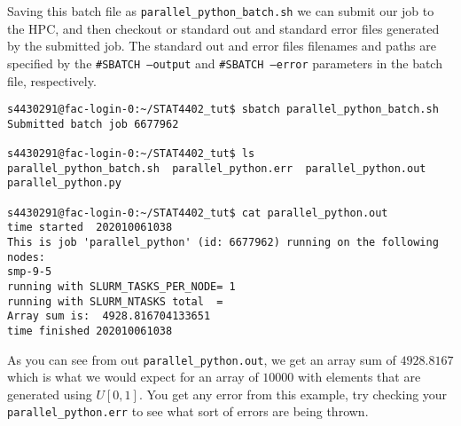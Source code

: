 Saving this batch file as \texttt{parallel\_python\_batch.sh} we can submit our job to the HPC, and then checkout or standard out and standard error files generated by the submitted job. The standard out and error files filenames and paths are specified by the \texttt{\#SBATCH --output} and \texttt{\#SBATCH --error} parameters in the batch file, respectively.
\begin{verbatim}
s4430291@fac-login-0:~/STAT4402_tut$ sbatch parallel_python_batch.sh 
Submitted batch job 6677962

s4430291@fac-login-0:~/STAT4402_tut$ ls
parallel_python_batch.sh  parallel_python.err  parallel_python.out  parallel_python.py

s4430291@fac-login-0:~/STAT4402_tut$ cat parallel_python.out 
time started  202010061038
This is job 'parallel_python' (id: 6677962) running on the following nodes:
smp-9-5
running with SLURM_TASKS_PER_NODE= 1 
running with SLURM_NTASKS total  =  
Array sum is:  4928.816704133651
time finished 202010061038
\end{verbatim}
As you can see from out \texttt{parallel\_python.out}, we get an array sum of $4928.8167$ which is what we would expect for an array of $10000$ with elements that are generated using $U \left[ 0,1 \right]$. You get any error from this example, try checking your \texttt{parallel\_python.err} to see what sort of errors are being thrown.